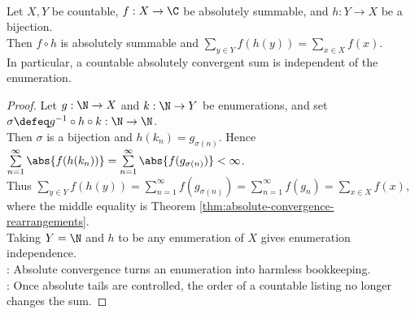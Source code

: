 \begin{theorem} \label{thm:absolute-countable-sums-well-defined} \\
Let $X,Y$ be countable, $f:X\to\C$ be absolutely summable, and $h:Y\to X$ be a bijection.\\
Then $f\circ h$ is absolutely summable and $\sum\limits_{y\in Y}f(h(y))=\sum\limits_{x\in X}f(x)$.\\
In particular, a countable absolutely convergent sum is independent of the enumeration.
\begin{proof}
Let $g:\N\to X$ and $k:\N\to Y$ be enumerations, and set $\sigma\defeq g^{-1}\circ h\circ k:\N\to\N$.\\
Then $\sigma$ is a bijection and $h(k_n)=g_{\sigma(n)}$. Hence $\sum\limits_{n=1}^{\infty}\abs{f(h(k_n))} =\sum\limits_{n=1}^{\infty}\abs{f(g_{\sigma(n)})}<\infty$.\\
Thus $\sum\limits_{y\in Y}f(h(y)) =\sum\limits_{n=1}^{\infty}f(g_{\sigma(n)}) =\sum\limits_{n=1}^{\infty}f(g_n) =\sum\limits_{x\in X}f(x)$, where the middle equality is Theorem \ref{thm:absolute-convergence-rearrangements}.\\
Taking $Y=\N$ and $h$ to be any enumeration of $X$ gives enumeration independence.\\
: Absolute convergence turns an enumeration into harmless bookkeeping.\\
: Once absolute tails are controlled, the order of a countable listing no longer changes the sum.
\end{proof}
\end{theorem}

